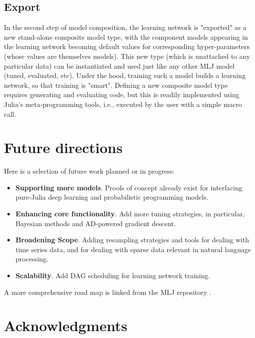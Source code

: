 \documentclass{article}
\begin{document}
\subsection{Export}

In the second step of model composition, the learning network is
"exported" as a new stand-alone composite model type, with the
component models appearing in the learning network becoming default
values for corresponding hyper-parameters (whose values are themselves
models). This new type (which is unattached to any particular data)
can be instantiated and used just like any other MLJ model (tuned,
evaluated, etc). Under the hood, training such a model builds a
learning network, so that training is "smart". Defining a new
composite model type requires generating and evaluating code, but this
is readily implemented using Julia's meta-programming tools, i.e.,
executed by the user with a simple macro call.

\section{Future directions}

Here is a selection of future work planned or in progress:

\begin{itemize}

\item \textbf{Supporting more models}. Proofs of concept already exist
  for interfacing pure-Julia deep learning and probabilistic
  programming models.

\item \textbf{Enhancing core functionality}. Add more tuning
  strategies, in particular, Bayesian methods and AD-powered gradient
  descent.

\item \textbf{Broadening Scope}. Adding resampling strategies and
  tools for dealing with time series data, and for dealing with sparse
  data relevant in natural language processing.

\item \textbf{Scalability}. Add DAG scheduling for learning network
  training.

\end{itemize}

A more comprehensive road map is linked from the MLJ repository
\cite{MLJ}.

\section*{Acknowledgments}
\end{document}
